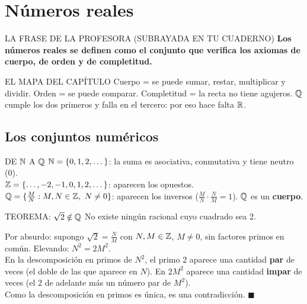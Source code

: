 \chapter{Números reales}

\apuntes
\begin{sello}{LA FRASE DE LA PROFESORA (SUBRAYADA EN TU CUADERNO)}
\textbf{Los números reales se definen como el conjunto que verifica los axiomas de cuerpo, de orden y de completitud.}
\end{sello}
\begin{tip}{EL MAPA DEL CAPÍTULO}
Cuerpo = se puede sumar, restar, multiplicar y dividir. Orden = se puede comparar. Completitud = la recta no tiene agujeros. $\mathbb{Q}$ cumple los dos primeros y falla en el tercero: por eso hace falta $\mathbb{R}$.
\end{tip}

\section{Los conjuntos numéricos}
\apuntes
\begin{memo}{DE $\mathbb{N}$ A $\mathbb{Q}$}
$\mathbb{N}=\{0,1,2,\dots\}$: la suma es asociativa, conmutativa y tiene neutro (0).\\
$\mathbb{Z}=\{\dots,-2,-1,0,1,2,\dots\}$: aparecen los opuestos.\\
$\mathbb{Q}=\{\frac MN: M,N\in\mathbb{Z},\ N\neq0\}$: aparecen los inversos ($\frac MN\cdot\frac NM=1$). $\mathbb{Q}$ es un \textbf{cuerpo}.
\end{memo}

\apuntes
\begin{sello}{TEOREMA: $\sqrt2\notin\mathbb{Q}$}
No existe ningún racional cuyo cuadrado sea 2.
\end{sello}
\begin{demo}
Por absurdo: supongo $\sqrt2=\frac NM$ con $N,M\in\mathbb{Z}$, $M\neq0$, sin factores primos en común. Elevando: $N^2=2M^2$.\\
En la descomposición en primos de $N^2$, el primo 2 aparece una cantidad \textbf{par} de veces (el doble de las que aparece en $N$). En $2M^2$ aparece una cantidad \textbf{impar} de veces (el 2 de adelante más un número par de $M^2$).\\
Como la descomposición en primos es única, es una contradicción. $\blacksquare$
\end{demo}

